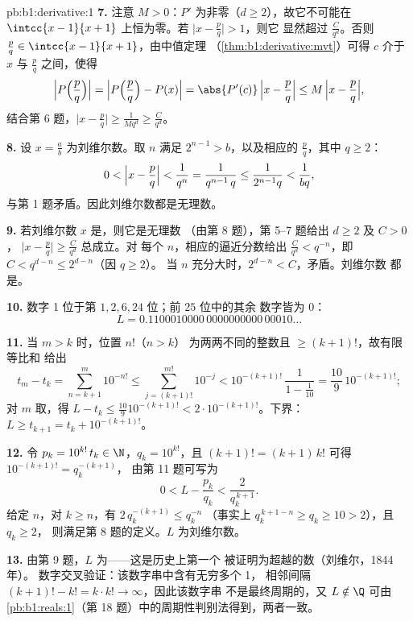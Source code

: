 \begin{solution}{pb:b1:derivative:1}
\textbf{7.} 注意 $M > 0$：$P'$ 为非零（$d \geq
2$），故它不可能在
$\intcc{x-1}{x+1}$ 上恒为零。若 $\bigl|x - \frac pq\bigr| > 1$，则它
显然超过 $\frac{C}{q^d}$。否则 $\frac pq \in
\intcc{x-1}{x+1}$，由中值定理
（\cref{thm:b1:derivative:mvt}）可得 $c$ 介于 $x$ 与
$\frac pq$ 之间，使得
\[
\Bigl|P\Bigl(\frac pq\Bigr)\Bigr|
= \Bigl|P\Bigl(\frac pq\Bigr) - P(x)\Bigr|
= \abs{P'(c)}\,\Bigl|x - \frac pq\Bigr|
\leq M\,\Bigl|x - \frac pq\Bigr| ,
\]
结合第 6 题，$\bigl|x - \frac pq\bigr| \geq
\frac{1}{Mq^d} \geq \frac{C}{q^d}$。

\textbf{8.} 设 $x = \frac ab$ 为刘维尔数。取 $n$ 满足
$2^{n-1} > b$，以及相应的 $\frac pq$，其中 $q \geq 2$：
\[
0 < \Bigl|x - \frac pq\Bigr| < \frac{1}{q^n}
= \frac{1}{q^{n-1}\,q} \leq \frac{1}{2^{n-1} q} <
\frac{1}{bq} ,
\]
与第 1 题矛盾。因此刘维尔数都是无理数。

\textbf{9.} 若刘维尔数 $x$ 是，则它是无理数
（由第 8 题），第 5--7 题给出 $d \geq 2$ 及 $C > 0$，
$\bigl|x - \frac pq\bigr| \geq \frac{C}{q^d}$ 总成立。对
每个 $n$，相应的逼近分数给出 $\frac{C}{q^d} <
q^{-n}$，即 $C < q^{d-n} \leq 2^{d-n}$（因 $q \geq 2$）。
当 $n$ 充分大时，$2^{d-n} < C$，矛盾。刘维尔数
都是。

\textbf{10.} 数字 1 位于第 $1, 2, 6, 24$ 位；前 $25$ 位中的其余
数字皆为 0：
\[
L = 0.1100010000\,0000000000\,00010\dots
\]

\textbf{11.} 当 $m > k$ 时，位置 $n!$（$n > k$）
为两两不同的整数且 $\geq (k+1)!$，故有限等比和
给出
\[
t_m - t_k = \sum_{n=k+1}^{m} 10^{-n!}
\leq \sum_{j = (k+1)!}^{m!} 10^{-j}
< 10^{-(k+1)!}\,\frac{1}{1 - \frac1{10}}
= \frac{10}{9}\,10^{-(k+1)!} ;
\]
对 $m$ 取，得 $L - t_k \leq
\frac{10}{9}10^{-(k+1)!} < 2\cdot10^{-(k+1)!}$。下界：$L
\geq t_{k+1} = t_k + 10^{-(k+1)!}$。

\textbf{12.} 令 $p_k = 10^{k!}\,t_k \in \N$，$q_k = 10^{k!}$，且
$(k+1)! = (k+1)\,k!$ 可得 $10^{-(k+1)!} = q_k^{-(k+1)}$，
由第 11 题可写为
\[
0 < L - \frac{p_k}{q_k} < \frac{2}{q_k^{\,k+1}} .
\]
给定 $n$，对 $k \geq n$，有 $2\,q_k^{-(k+1)} \leq q_k^{-n}$
（事实上 $q_k^{\,k+1-n} \geq q_k \geq 10 > 2$），且 $q_k \geq 2$，
则满足第 8 题的定义。$L$ 为刘维尔数。

\textbf{13.} 由第 9 题，$L$ 为——这是历史上第一个
被证明为超越的数（刘维尔，1844 年）。
数字交叉验证：该数字串中含有无穷多个 1，
相邻间隔 $(k+1)! - k! = k\cdot k! \to \infty$，因此该数字串
不是最终周期的，又 $L \notin \Q$ 可由
\cref{pb:b1:reals:1}（第 18 题）中的周期性判别法得到，两者一致。


\end{solution}
